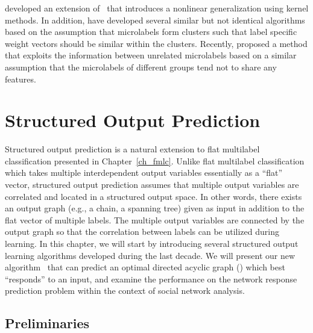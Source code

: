 {\citet{Argyriou08convex} developed an extension of \mtl\ that introduces a nonlinear generalization using kernel methods.
In addition, \citet{Argyriou08an,Jacob09cluster} have developed several similar but not identical algorithms based on the assumption that microlabels form clusters such that label specific weight vectors should be similar within the clusters.
Recently, \citet{Paredes12exploit} proposed a method that exploits the information between unrelated microlabels based on a similar assumption that the microlabels of different groups tend not to share any features.




%
%
\chapter{Structured Output Prediction} \label{ch_sop}

Structured output prediction is a natural extension to flat multilabel classification presented in Chapter~\ref{ch_fmlc}.
Unlike flat multilabel classification which takes multiple interdependent output variables essentially as a ``flat'' vector, structured output prediction assumes that multiple output variables are correlated and located in a structured output space.
In other words, there exists an output graph (e.g., a chain, a spanning tree) given as input in addition to the flat vector of multiple labels.
The multiple output variables are connected by the output graph so that the correlation between labels can be utilized during learning.
In this chapter, we will start by introducing several structured output learning algorithms developed during the last decade.
We will present our new algorithm \spin\ that can predict an optimal directed acyclic graph (\daggraph) which best ``responds'' to an input, and examine the performance on the network response prediction problem within the context of social network analysis.





%
%
\section{Preliminaries}

}
